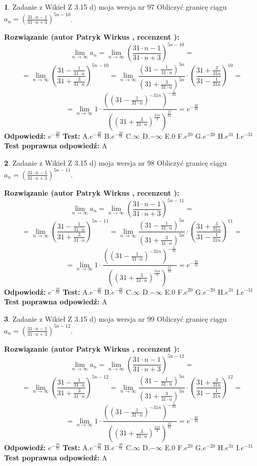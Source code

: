 \documentclass[12pt, a4paper]{article}
\theoremstyle{definition} %
\newtheorem{zad}{}
\newcommand{\zadStart}[1]{\begin{zad}#1\newline}
\newcommand{\zadStop}{\end{zad}}
\newcommand{\rozwStart}[2]{\noindent \textbf{Rozwiązanie (autor #1 , recenzent #2): }\newline}
\newcommand{\rozwStop}{\newline}
\newcommand{\odpStart}{\noindent \textbf{Odpowiedź:}\newline}
\newcommand{\odpStop}{\newline}
\newcommand{\testStart}{\noindent \textbf{Test:}\newline}
\newcommand{\testStop}{\newline}
\newcommand{\kluczStart}{\noindent \textbf{Test poprawna odpowiedź:}\newline}
\newcommand{\kluczStop}{\newline}
\begin{document}
\zadStart{Zadanie z Wikieł Z 3.15 d) moja wersja nr 97}
Obliczyć granicę ciągu $a_{n}=(\frac{31\cdot n - 1}{31 \cdot n + 3})^{5n-10}$.
\zadStop
\rozwStart{Patryk Wirkus}{}
$$\lim\limits_{n\to\infty} a_{n} = \lim\limits_{n\to\infty}(\frac{31\cdot n - 1}{31 \cdot n + 3})^{5n-10}=$$
$$=\lim\limits_{n\to\infty}(\frac{31 - \frac{1}{31\cdot n}}{31 + \frac{3}{31 \cdot n}})^{5n-10}=\lim\limits_{n\to\infty}\frac{(31 - \frac{1}{31\cdot n})^{5n}}{(31 + \frac{3}{31\cdot n})^{5n}} \cdot (\frac{31+\frac{3}{31n}}{31-\frac{1}{31n}})^{10}=$$
$$=\lim\limits_{n\to\infty} 1 \cdot \frac{((31-\frac{1}{31 \cdot n})^{-31n})^{-\frac{5}{31}}}{((31+\frac{3}{31 \cdot n})^{\frac{31n}{3}})^{\frac{15}{31}}} =e^{-\frac{20}{31}}$$
\rozwStop
\odpStart
$e^{-\frac{20}{31}}$
\odpStop
\testStart
A.$ e^{-\frac{20}{31}}$
B.$ e^{-\frac{20}{31}}$
C.$\infty$
D.$-\infty$
E.$0$
F.$e^{20}$
G.$e^{-20}$
H.$e^{31}$
I.$e^{-31}$
\testStop
\kluczStart
A
\kluczStop



\zadStart{Zadanie z Wikieł Z 3.15 d) moja wersja nr 98}
Obliczyć granicę ciągu $a_{n}=(\frac{31\cdot n - 1}{31 \cdot n + 3})^{5n-11}$.
\zadStop
\rozwStart{Patryk Wirkus}{}
$$\lim\limits_{n\to\infty} a_{n} = \lim\limits_{n\to\infty}(\frac{31\cdot n - 1}{31 \cdot n + 3})^{5n-11}=$$
$$=\lim\limits_{n\to\infty}(\frac{31 - \frac{1}{31\cdot n}}{31 + \frac{3}{31 \cdot n}})^{5n-11}=\lim\limits_{n\to\infty}\frac{(31 - \frac{1}{31\cdot n})^{5n}}{(31 + \frac{3}{31\cdot n})^{5n}} \cdot (\frac{31+\frac{3}{31n}}{31-\frac{1}{31n}})^{11}=$$
$$=\lim\limits_{n\to\infty} 1 \cdot \frac{((31-\frac{1}{31 \cdot n})^{-31n})^{-\frac{5}{31}}}{((31+\frac{3}{31 \cdot n})^{\frac{31n}{3}})^{\frac{15}{31}}} =e^{-\frac{20}{31}}$$
\rozwStop
\odpStart
$e^{-\frac{20}{31}}$
\odpStop
\testStart
A.$ e^{-\frac{20}{31}}$
B.$ e^{-\frac{20}{31}}$
C.$\infty$
D.$-\infty$
E.$0$
F.$e^{20}$
G.$e^{-20}$
H.$e^{31}$
I.$e^{-31}$
\testStop
\kluczStart
A
\kluczStop



\zadStart{Zadanie z Wikieł Z 3.15 d) moja wersja nr 99}
Obliczyć granicę ciągu $a_{n}=(\frac{31\cdot n - 1}{31 \cdot n + 3})^{5n-12}$.
\zadStop
\rozwStart{Patryk Wirkus}{}
$$\lim\limits_{n\to\infty} a_{n} = \lim\limits_{n\to\infty}(\frac{31\cdot n - 1}{31 \cdot n + 3})^{5n-12}=$$
$$=\lim\limits_{n\to\infty}(\frac{31 - \frac{1}{31\cdot n}}{31 + \frac{3}{31 \cdot n}})^{5n-12}=\lim\limits_{n\to\infty}\frac{(31 - \frac{1}{31\cdot n})^{5n}}{(31 + \frac{3}{31\cdot n})^{5n}} \cdot (\frac{31+\frac{3}{31n}}{31-\frac{1}{31n}})^{12}=$$
$$=\lim\limits_{n\to\infty} 1 \cdot \frac{((31-\frac{1}{31 \cdot n})^{-31n})^{-\frac{5}{31}}}{((31+\frac{3}{31 \cdot n})^{\frac{31n}{3}})^{\frac{15}{31}}} =e^{-\frac{20}{31}}$$
\rozwStop
\odpStart
$e^{-\frac{20}{31}}$
\odpStop
\testStart
A.$ e^{-\frac{20}{31}}$
B.$ e^{-\frac{20}{31}}$
C.$\infty$
D.$-\infty$
E.$0$
F.$e^{20}$
G.$e^{-20}$
H.$e^{31}$
I.$e^{-31}$
\testStop
\kluczStart
A
\kluczStop
\end{document}
